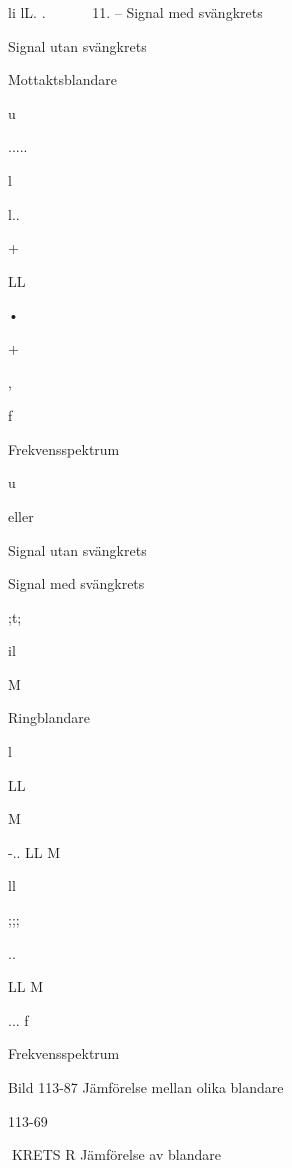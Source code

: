 li lL. . ~ ~~ ~ 11.
--
Signal med svängkrets

Signal utan svängkrets

Mottaktsblandare

u

.....

l

l..

+

LL

•

+

, 

f

Frekvensspektrum

u

eller

Signal utan svängkrets

Signal med svängkrets

;t;

il

M

Ringblandare

l

LL

M

-..
LL
M

ll

;;;

..

LL
M

... f

Frekvensspektrum

Bild 113-87 Jämförelse mellan olika blandare

113-69

KRETS R
Jämförelse av blandare

